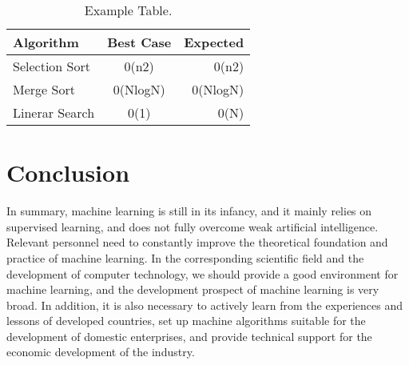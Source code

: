 \documentclass{article}
\begin{document}
\begin{table}[]
    \centering
    \begin{tabular}{l|c|r}
    \hline
    Algorithm & Best Case & Expected\\
    \hline
    Selection Sort & 0(n2) & 0(n2)\\
    \hline
    Merge Sort & 0(NlogN) & 0(NlogN)\\
    \hline
    Linerar Search & 0(1) & 0(N)
    
    \end{tabular}
    \caption{Example Table.}
    \label{tab:my_label}
\end{table}

\section{Conclusion}
In summary, machine learning is still in its infancy, and it mainly relies on supervised learning, and 
does not fully overcome weak artificial intelligence. Relevant personnel need to constantly improve 
the theoretical foundation and practice of machine learning. In the corresponding scientific field and 
the development of computer technology, we should provide a good environment for machine learning, 
and the development prospect of machine learning is very broad. In addition, it is also necessary to 
actively learn from the experiences and lessons of developed countries, set up machine algorithms 
suitable for the development of domestic enterprises, and provide technical support for the economic 
development of the industry.
\end{document}
